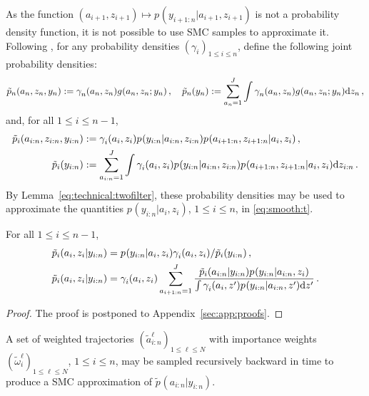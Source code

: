 As the function $(a_{i+1},z_{i+1})\mapsto p_{}(y_{i+1:n}|a_{i+1},z_{i+1})$ is not a probability density function, it is not possible to use SMC samples to approximate it. %
Following \cite{briers:doucet:maskell:2010}, for any probability densities $(\gamma^{}_{i})_{1\le i \le n}$, define the following joint probability densities:
\[
\tilde{p}_{n}(a_n,z_n,y_n) := \gamma^{}_{n}(a_n,z_n)g_{}(a_n,z_n;y_n)\,,\quad \tilde{p}_{n}(y_n):= \sum_{a_n=1}^J\int \gamma^{}_{n}(a_n,z_n)g_{}(a_n,z_n;y_n)\mathrm{d} z_n\,,
\]
and, for all $1\le i\le n-1$,
\begin{align*}
\tilde{p}_{i}(a_{i:n},z_{i:n},y_{i:n}) &:= \gamma^{}_{i}(a_i,z_i)p_{}(y_{i:n}|a_{i:n},z_{i:n})p_{}(a_{i+1:n},z_{i+1:n}|a_i,z_i)\,,\\
\tilde{p}_{i}(y_{i:n})&:= \sum_{a_{i:n}=1}^J\int \gamma^{}_{i}(a_i,z_i)p_{}(y_{i:n}|a_{i:n},z_{i:n})p_{}(a_{i+1:n},z_{i+1:n}|a_i,z_i)\mathrm{d} z_{i:n}\,.
\end{align*}
By Lemma~\ref{eq:technical:twofilter}, these probability densities may be used to approximate the quantities $p_{}(y_{i:n}|a_{i},z_{i})$, $1\le i \le n$, in \eqref{eq:smooth:t}.
\begin{lemma}
\label{eq:technical:twofilter}
For all $1\le i \le n-1$,
\begin{align}
\tilde{p}_{i}(a_i,z_i|y_{i:n}) &= p_{}(y_{i:n}|a_i,z_i)\gamma^{}_{i}(a_i,z_i)/\tilde{p}_{i}(y_{i:n})\,,\label{eq:p:y1:n}\\
\tilde{p}_{i}(a_{i},z_{i}|y_{i:n}) &= \gamma^{}_i(a_i,z_i)\sum_{a_{i+1:n}=1}^J\frac{\tilde{p}_{i}(a_{i:n}|y_{i:n})p_{}(y_{i:n}|a_{i:n},z_{i})}{\int \gamma^{}_{i}(a_i,z')p_{}(y_{i:n}|a_{i:n},z')\mathrm{d} z'}\label{eq:p:ai:zi}\,.
\end{align}
\end{lemma}
\begin{proof}
The proof is postponed to Appendix~\ref{sec:app:proofs}.
\end{proof}
A set of weighted trajectories $(\tilde{a}^\ell_{i:n})_{1\le \ell\le N}$ with importance weights $(\tilde{\omega}^\ell_i)_{1\le \ell\le N}$, $1\le i \le n$, may be sampled recursively backward in time to produce a SMC approximation of $\tilde{p}_{}(a_{i:n}|y_{i:n})$.
